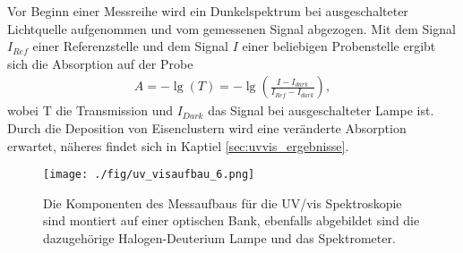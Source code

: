 Vor Beginn einer Messreihe wird ein Dunkelspektrum bei ausgeschalteter Lichtquelle aufgenommen und vom gemessenen Signal abgezogen. 
Mit dem Signal $I_{Ref}$ einer Referenzstelle und dem Signal $I$ einer beliebigen Probenstelle ergibt sich die Absorption auf der Probe
\begin{align}
    A=- \lg\left(T\right) = -\lg\left(\frac{I-I_{dark}}{I_{Ref}-I_{dark}}\right),
\end{align}
wobei T die Transmission und $I_{Dark}$ das Signal bei ausgeschalteter Lampe ist.
Durch die Deposition von Eisenclustern wird eine veränderte Absorption erwartet, näheres findet sich in Kaptiel \ref{sec:uvvis_ergebnisse}.
\begin{figure}
    \centering
    \texttt{[image: ./fig/uv\_visaufbau\_6.png]}
    \caption{Die Komponenten des Messaufbaus für die UV/vis Spektroskopie sind montiert auf einer optischen Bank, ebenfalls abgebildet sind die dazugehörige Halogen-Deuterium Lampe und das Spektrometer.}
    \label{fig:uv_visaufbau}
\end{figure}
